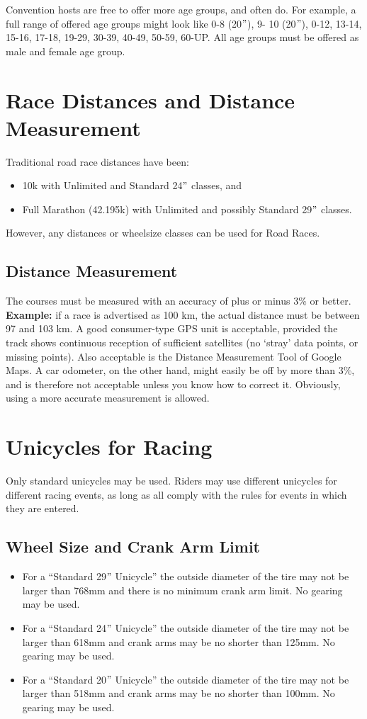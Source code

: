 Convention hosts are free to offer more age groups, and often do.
For example, a full range of offered age groups might look like 0-8 (20$"$), 9- 10 (20$"$), 0-12, 13-14, 15-16, 17-18, 19-29, 30-39, 40-49, 50-59, 60-UP.
All age groups must be offered as male and female age group.

\section{Race Distances and Distance Measurement}
Traditional road race distances have been: 
\begin{itemize}
\item 10k with Unlimited and Standard 24$"$ classes, and 
\item Full Marathon (42.195k) with Unlimited and possibly Standard 29$"$ classes.
\end{itemize}
However, any distances or wheelsize classes can be used for Road Races.

\subsection {Distance Measurement}
The courses must be measured with an accuracy of plus or minus 3\% or better.
\textbf{Example:} if a race is advertised as 100 km, the actual distance must be between 97 and 103 km.
A good consumer-type GPS unit is acceptable, provided the track shows continuous reception of sufficient satellites (no `stray' data points, or missing points).
Also acceptable is the Distance Measurement Tool of Google Maps.
A car odometer, on the other hand, might easily be off by more than 3\%, and is therefore not acceptable unless you know how to correct it.
Obviously, using a more accurate measurement is allowed.

\section{Unicycles for Racing}
Only standard unicycles may be used.
Riders may use different unicycles for different racing events, as long as all comply with the rules for events in which they are entered.
\subsection{Wheel Size and Crank Arm Limit}
\begin{itemize}
\item For a ``Standard 29$"$ Unicycle'' the outside diameter of the tire may not be larger than 768mm and there is no minimum crank arm limit.
No gearing may be used.
\item For a ``Standard 24$"$ Unicycle'' the outside diameter of the tire may not be larger than 618mm and crank arms may be no shorter than 125mm.
No gearing may be used.
\item For a ``Standard 20$"$ Unicycle'' the outside diameter of the tire may not be larger than 518mm and crank arms may be no shorter than 100mm.
No gearing may be used.
\end{itemize}

